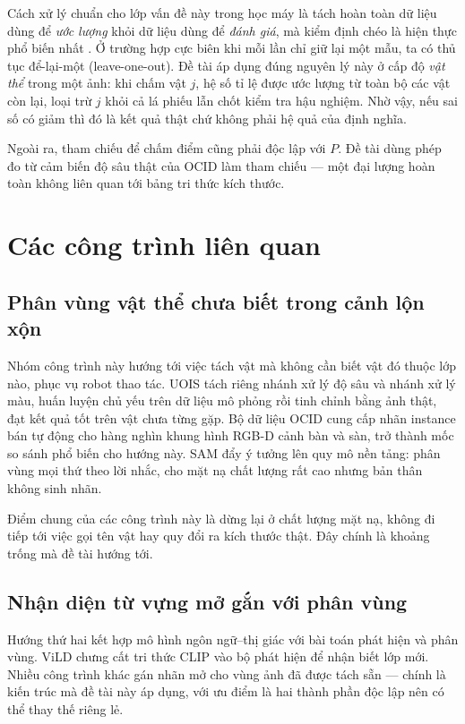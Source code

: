 Cách xử lý chuẩn cho lớp vấn đề này trong học máy là tách hoàn toàn dữ liệu dùng để \emph{ước
lượng} khỏi dữ liệu dùng để \emph{đánh giá}, mà kiểm định chéo là hiện thực phổ biến nhất
\cite{kohavi1995crossvalidation}. Ở trường hợp cực biên khi mỗi lần chỉ giữ lại một mẫu, ta có
thủ tục để-lại-một (leave-one-out). Đề tài áp dụng đúng nguyên lý này ở cấp độ \emph{vật thể}
trong một ảnh: khi chấm vật $j$, hệ số tỉ lệ được ước lượng từ toàn bộ các vật còn lại, loại trừ
$j$ khỏi cả lá phiếu lẫn chốt kiểm tra hậu nghiệm. Nhờ vậy, nếu sai số có giảm thì đó là kết quả
thật chứ không phải hệ quả của định nghĩa.

Ngoài ra, tham chiếu để chấm điểm cũng phải độc lập với $P$. Đề tài dùng phép đo từ cảm biến độ
sâu thật của OCID làm tham chiếu --- một đại lượng hoàn toàn không liên quan tới bảng tri thức
kích thước.

\section{Các công trình liên quan}

\subsection{Phân vùng vật thể chưa biết trong cảnh lộn xộn}

Nhóm công trình này hướng tới việc tách vật mà không cần biết vật đó thuộc lớp nào, phục vụ
robot thao tác. UOIS \cite{xie2021uois} tách riêng nhánh xử lý độ sâu và nhánh xử lý màu, huấn
luyện chủ yếu trên dữ liệu mô phỏng rồi tinh chỉnh bằng ảnh thật, đạt kết quả tốt trên vật chưa
từng gặp. Bộ dữ liệu OCID \cite{suchi2019ocid} cung cấp nhãn instance bán tự động cho hàng nghìn
khung hình RGB-D cảnh bàn và sàn, trở thành mốc so sánh phổ biến cho hướng này. SAM
\cite{kirillov2023sam} đẩy ý tưởng lên quy mô nền tảng: phân vùng mọi thứ theo lời nhắc, cho mặt
nạ chất lượng rất cao nhưng bản thân không sinh nhãn.

Điểm chung của các công trình này là dừng lại ở chất lượng mặt nạ, không đi tiếp tới việc gọi tên vật hay quy đổi ra kích thước thật. Đây chính là khoảng trống mà đề tài hướng tới.

\subsection{Nhận diện từ vựng mở gắn với phân vùng}

Hướng thứ hai kết hợp mô hình ngôn ngữ--thị giác với bài toán phát hiện và phân vùng. ViLD
\cite{gu2022vild} chưng cất tri thức CLIP vào bộ phát hiện để nhận biết lớp mới. Nhiều công
trình khác gán nhãn mở cho vùng ảnh đã được tách sẵn --- chính là kiến trúc mà đề tài này áp
dụng, với ưu điểm là hai thành phần độc lập nên có thể thay thế riêng lẻ.

